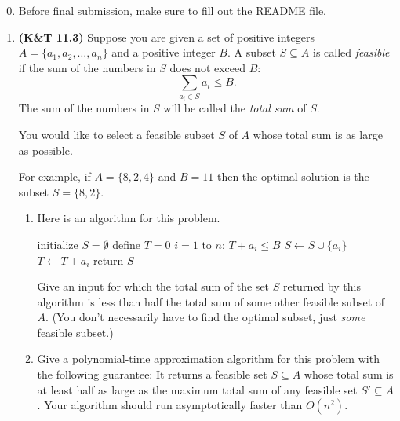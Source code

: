\documentclass[11pt]{article}
\begin{document}
\begin{enumerate}
  \setcounter{enumi}{-1}
\item Before final submission, make sure to fill out the README file.

  \item {\bf (K\&T 11.3)}
    Suppose you are given a set of positive integers $A=\{a_1, a_2,
    \ldots, a_n\}$ and a positive integer $B$.
    A subset $S \subseteq A$ is called \emph{feasible} if the sum of
    the numbers in $S$ does not exceed $B$:
    $$ \sum_{a_i \in S} a_i \leq B.$$
    The sum of the numbers in $S$ will be called the \emph{total sum}
    of $S$.

    You would like to select a feasible subset $S$ of $A$ whose total
    sum is as large as possible.
    
    For example, if $A=\{8,2,4\}$ and $B=11$ then the optimal solution
    is the subset $S=\{8,2\}$.

    \begin{enumerate}
      \item
      Here is an algorithm for this problem.
      \begin{codebox}
        \li initialize $S = \emptyset$
        \li define $T=0$
        \li \For $i=1$ to $n$: \Do
        \li \If $T + a_i \leq B$ \Then
        \li $S \gets S \cup \{a_i\}$
        \li $T \gets T + a_i$
        \End %
        \End %
        \li return $S$
      \end{codebox}
      Give an input for which the total sum of the set $S$ returned by
      this algorithm is less than half the total sum of some other
      feasible subset of $A$. (You don't necessarily have to find the
      optimal subset, just \emph{some} feasible subset.)

    \item Give a polynomial-time approximation algorithm for this
      problem with the following guarantee:
      It returns a feasible set $S \subseteq A$ whose total sum is at
      least half as large as the maximum total sum of any feasible set
      $S' \subseteq A$.
      Your algorithm should run asymptotically faster than $O(n^2)$.
    \end{enumerate}


\end{enumerate}
\end{document}
